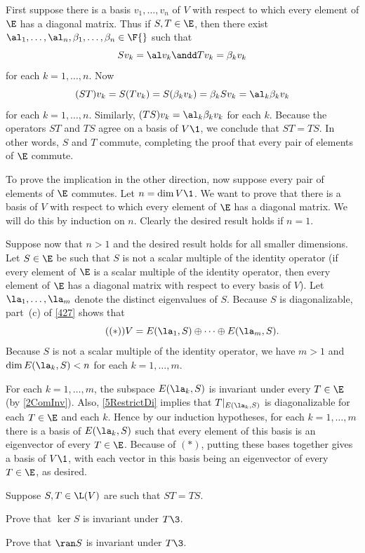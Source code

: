 \begin{Solution}
First suppose there is a basis $v_1, \ldots, v_n$ of $V$ with respect to which every element of $\E$ has a diagonal matrix. Thus if $S, T \in \E$, then there exist
$\al_1, \ldots, \al_n, \beta_1, \ldots, \beta_n \in \F{}$ such that
\[
Sv_k = \al v_k \andd Tv_k = \beta_k v_k
\]
for each $k = 1, \ldots, n$. Now
\[
(ST)v_k = S(Tv_k) = S(\beta_k v_k) = \beta_k Sv_k = \al_k \beta_k v_k
\]
for each $k = 1, \ldots, n$. Similarly, $(TS)v_k = \al_k \beta_k v_k$ for each $k$. Because the operators $ST$ and $TS$ agree on a basis of $V\1$, we conclude that $ST = TS$. In other words, $S$ and $T$ commute, completing the proof that every pair of elements of $\E$ commute.

To prove the implication in the other direction, now suppose every pair of elements of $\E$ commutes. Let $n = \dim V\1$. We want to prove that there is a basis of $V$ with respect to which every element of $\E$ has a diagonal matrix. We will do this by induction on $n$. Clearly the desired result holds if $n = 1$.

Suppose now that $n > 1$ and the desired result holds for all smaller dimensions. Let $S \in \E$ be such that $S$ is not a scalar multiple of the identity operator (if every element of $\E$ is a scalar multiple of the identity operator, then every element of $\E$ has a diagonal matrix with respect to every basis of $V$). Let $\la_1, \ldots, \la_m$ denote the distinct eigenvalues of $S$. Because $S$ is diagonalizable, part~(c) of \ref{427} shows that
\[ \tag{$(*)$}
V = E(\la_1, S) \oplus \cdots \oplus E(\la_m, S).
\]
Because $S$ is not a scalar multiple of the identity operator, we have $m > 1$ and $\dim E(\la_k, S) < n$ for each $k = 1, \ldots, m$.

For each $k = 1, \ldots, m$, the subspace  $E(\la_k, S)$ is invariant under every $T \in \E$ (by \ref{2ComInv}). Also, \ref{5RestrictDi} implies that $T|_{E(\la_k, S)}$ is diagonalizable for each $T \in \E$ and each $k$. Hence by our induction hypotheses, for each $k = 1, \ldots, m$ there is a basis of $E(\la_k, S)$ such that every element of this basis is an eigenvector of every $T \in \E$. Because of $(*)$, putting these bases together gives a basis of $V\1$, with each vector in this basis being an eigenvector of every $T \in \E$, as desired.
\end{Solution}

\exercise
Suppose $S, T \in \L(V)$ are such that $ST = TS$.
\begin{subtheorem}
\item
Prove that $\ker S$ is invariant under $T\3$.
\item
Prove that $\ran S$ is invariant under $T\3$.
\end{subtheorem}

